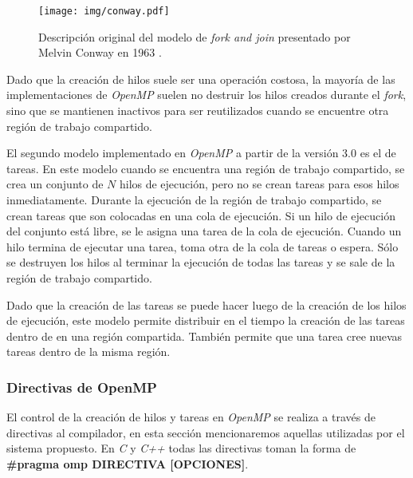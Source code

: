 \begin{figure}[h]

	\centering

	\texttt{[image: img/conway.pdf]}

	\caption{Descripción original del modelo de \emph{fork and join}
	presentado por Melvin Conway en 1963 \cite{conway1963}.}

	\label{conway}

\end{figure}

Dado que la creación de hilos suele ser una operación costosa, la mayoría de las
implementaciones de \emph{OpenMP} suelen no destruir los hilos creados durante
el \emph{fork}, sino que se mantienen inactivos para ser reutilizados cuando se
encuentre otra región de trabajo compartido.

El segundo modelo implementado en \emph{OpenMP} a partir de la versión 3.0 es
el de tareas. En este modelo cuando se encuentra una región de trabajo
compartido, se crea un conjunto de $N$ hilos de ejecución, pero no se crean
tareas para esos hilos inmediatamente. Durante la ejecución de la región de
trabajo compartido, se crean tareas que son colocadas en una cola de ejecución.
Si un hilo de ejecución del conjunto está libre, se le asigna una tarea de la
cola de ejecución. Cuando un hilo termina de ejecutar una tarea, toma otra de la
cola de tareas o espera. Sólo se destruyen los hilos al terminar la ejecución de
todas las tareas y se sale de la región de trabajo compartido.

Dado que la creación de las tareas se puede hacer luego de la creación de los
hilos de ejecución, este modelo permite distribuir en el tiempo la creación de
las tareas dentro de en una región compartida. También permite que una tarea
cree nuevas tareas dentro de la misma región.

\subsubsection{Directivas de OpenMP}

El control de la creación de hilos y tareas en \emph{OpenMP} se realiza a través
de directivas al compilador, en esta sección mencionaremos aquellas utilizadas
por el sistema propuesto. En \emph{C} y \emph{C++} todas las directivas toman la
forma de \textbf{\#pragma omp DIRECTIVA [OPCIONES]}.

